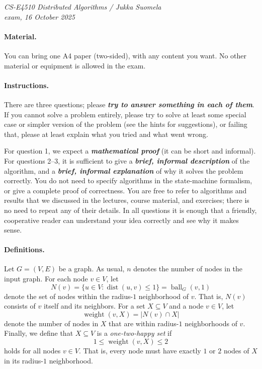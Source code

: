 \documentclass[12pt,a4paper]{article}
\newcommand{\cemph}[1]{\textbf{\emph{\boldmath #1}}}
\DeclareMathOperator{\dist}{dist}
\DeclareMathOperator{\ball}{ball}
\DeclareMathOperator{\weight}{weight}
\begin{document}
\noindent
\emph{CS-E4510 Distributed Algorithms / Jukka Suomela\\
exam, 16 October 2025}

\paragraph{Material.}

You can bring one A4 paper (two-sided), with any content you want. No other material or equipment is allowed in the exam.

\paragraph{Instructions.}

There are three questions; please \cemph{try to answer something in each of them}. If you cannot solve a problem entirely, please try to solve at least some special case or simpler version of the problem (see the hints for suggestions), or failing that, please at least explain what you tried and what went wrong.

For question 1, we expect a \cemph{mathematical proof} (it can be short and informal). For questions 2--3, it is sufficient to give a \cemph{brief, informal description} of the algorithm, and a \cemph{brief, informal explanation} of why it solves the problem correctly. You do not need to specify algorithms in the state-machine formalism, or give a complete proof of correctness. You are free to refer to algorithms and results that we discussed in the lectures, course material, and exercises; there is no need to repeat any of their details. In all questions it is enough that a friendly, cooperative reader can understand your idea correctly and see why it makes sense.

\paragraph{Definitions.}

Let $G=(V,E)$ be a graph. As usual, $n$ denotes the number of nodes in the input graph. For each node $v \in V$, let
\[
    N(v) = \{ u \in V : \dist(u,v) \le 1 \} = \ball_G(v, 1)
\]
denote the set of nodes within the radius-$1$ neighborhood of $v$. That is, $N(v)$ consists of $v$ itself and its neighbors. For a set $X \subseteq V$ and a node $v \in V$, let
\[
    \weight(v,X) = \left| N(v) \cap X \right|
\]
denote the number of nodes in $X$ that are within radius-$1$ neighborhoods of $v$. Finally, we define that $X \subseteq V$ is a \emph{one-two-happy set} if
\[
1 \le \weight(v,X) \le 2
\]
holds for all nodes $v \in V$. That is, every node must have exactly $1$ or $2$ nodes of $X$ in its radius-$1$ neighborhood.
\end{document}
